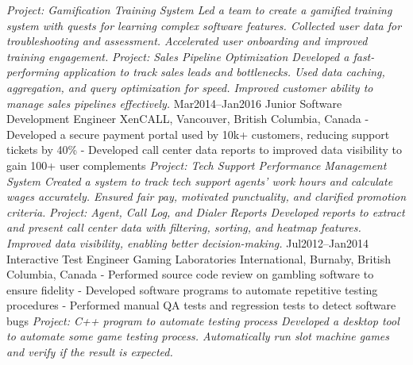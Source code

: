 \documentclass[9pt]{developercv} %
\begin{document}
\begin{entrylist}
{            \textit{Project: Gamification Training System\newline
            Led a team to create a gamified training system with quests for learning complex software features. 
            Collected user data for troubleshooting and assessment. 
            Accelerated user onboarding and improved training engagement. \newline\newline}
            \textit{Project: Sales Pipeline Optimization\newline
            Developed a fast-performing application to track sales leads and bottlenecks. 
            Used data caching, aggregation, and query optimization for speed. 
            Improved customer ability to manage sales pipelines effectively.\newline}
        }
	\entry
		{Mar2014--Jan2016}
		{Junior Software Development Engineer}
		{XenCALL, Vancouver, British Columbia, Canada}
		{
            - Developed a secure payment portal used by 10k+ customers, reducing support tickets by 40\%\newline
            - Developed call center data reports to improved data visibility to gain 100+ user complements\newline
            \newline
            \textit{Project: Tech Support Performance Management System\newline
            Created a system to track tech support agents' work hours and calculate wages accurately. 
            Ensured fair pay, motivated punctuality, and clarified promotion criteria.
            \newline\newline}
            \textit{Project: Agent, Call Log, and Dialer Reports\newline
            Developed reports to extract and present call center data with filtering, sorting, and heatmap features. 
            Improved data visibility, enabling better decision-making.\newline}
        }
    \entry
		{Jul2012--Jan2014}
		{Interactive Test Engineer}
		{Gaming Laboratories International, Burnaby, British Columbia, Canada}
		{
            - Performed source code review on gambling software to ensure fidelity\newline
            - Developed software programs to automate repetitive testing procedures\newline
            - Performed manual QA tests and regression tests to detect software bugs\newline\newline
            \textit{Project: C++ program to automate testing process\newline
            Developed a desktop tool to automate some game testing process. 
            Automatically run slot machine games and verify if the result is expected.\newline}
        }
\end{entrylist}
\end{document}
